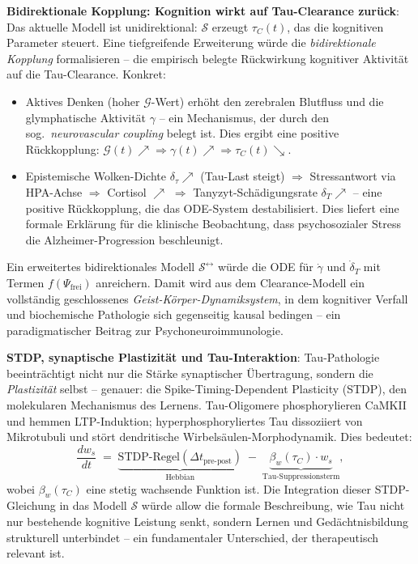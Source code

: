 ﻿\documentclass[12pt,a4paper]{article}
\theoremstyle{definition}
\begin{document}
	\textbf{Bidirektionale Kopplung: Kognition wirkt auf Tau-Clearance zurück}:
	Das aktuelle Modell ist unidirektional: $\mathcal{S}$ erzeugt $\tau_C(t)$, das die kognitiven Parameter steuert. Eine tiefgreifende Erweiterung würde die \emph{bidirektionale Kopplung} formalisieren -- die empirisch belegte Rückwirkung kognitiver Aktivität auf die Tau-Clearance. Konkret:
	\begin{itemize}
		\item Aktives Denken (hoher $\mathcal{G}$-Wert) erhöht den zerebralen Blutfluss und die glymphatische Aktivität $\gamma$ -- ein Mechanismus, der durch den sog.\ \emph{neurovascular coupling} belegt ist. Dies ergibt eine positive Rückkopplung: $\mathcal{G}(t) \nearrow \Rightarrow \gamma(t) \nearrow \Rightarrow \tau_C(t) \searrow$.
		\item Epistemische Wolken-Dichte $\delta_\tau \nearrow$ (Tau-Last steigt) $\Rightarrow$ Stressantwort via HPA-Achse $\Rightarrow$ Cortisol $\nearrow$ $\Rightarrow$ Tanyzyt-Schädigungsrate $\delta_T \nearrow$ -- eine positive Rückkopplung, die das ODE-System destabilisiert. Dies liefert eine formale Erklärung für die klinische Beobachtung, dass psychosozialer Stress die Alzheimer-Progression beschleunigt.
	\end{itemize}
	Ein erweitertes bidirektionales Modell $\mathcal{S}^{\leftrightarrow}$ würde die ODE für $\dot{\gamma}$ und $\dot{\delta}_T$ mit Termen $f(\Psi_{\mathrm{frei}})$ anreichern. Damit wird aus dem Clearance-Modell ein vollständig geschlossenes \emph{Geist-Körper-Dynamiksystem}, in dem kognitiver Verfall und biochemische Pathologie sich gegenseitig kausal bedingen -- ein paradigmatischer Beitrag zur Psychoneuroimmunologie.

	\textbf{STDP, synaptische Plastizität und Tau-Interaktion}:
	Tau-Pathologie beeinträchtigt nicht nur die Stärke synaptischer Übertragung, sondern die \emph{Plastizität} selbst -- genauer: die Spike-Timing-Dependent Plasticity (STDP), den molekularen Mechanismus des Lernens. Tau-Oligomere phosphorylieren CaMKII und hemmen LTP-Induktion; hyperphosphoryliertes Tau dissoziiert von Mikrotubuli und stört dendritische Wirbelsäulen-Morphodynamik. Dies bedeutet:
	\[
		\frac{d w_s}{dt} \;=\; \underbrace{\text{STDP-Regel}(\Delta t_{\text{pre-post}})}_{\text{Hebbian}} \;-\; \underbrace{\beta_w(\tau_C) \cdot w_s}_{\text{Tau-Suppressionsterm}},
	\]
	wobei $\beta_w(\tau_C)$ eine stetig wachsende Funktion ist. Die Integration dieser STDP-Gleichung in das Modell $\mathcal{S}$ würde allow die formale Beschreibung, wie Tau nicht nur bestehende kognitive Leistung senkt, sondern Lernen und Gedächtnisbildung strukturell unterbindet -- ein fundamentaler Unterschied, der therapeutisch relevant ist.
\end{document}

